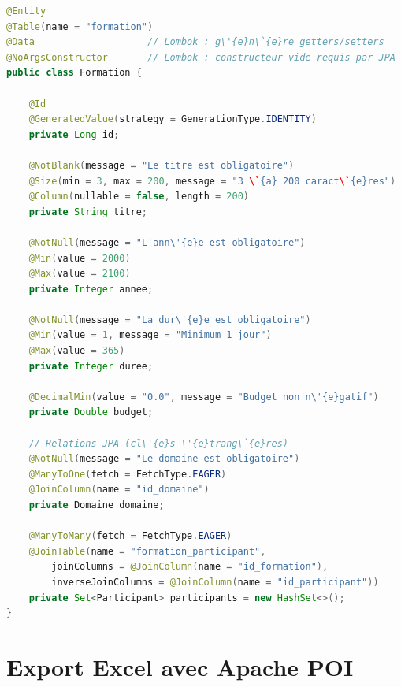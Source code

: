 \documentclass[12pt,a4paper]{report}
\begin{document}
\begin{lstlisting}[language=Java, caption={Formation.java --- Entit\'{e} principale avec validation}]
@Entity
@Table(name = "formation")
@Data                    // Lombok : g\'{e}n\`{e}re getters/setters
@NoArgsConstructor       // Lombok : constructeur vide requis par JPA
public class Formation {

    @Id
    @GeneratedValue(strategy = GenerationType.IDENTITY)
    private Long id;

    @NotBlank(message = "Le titre est obligatoire")
    @Size(min = 3, max = 200, message = "3 \`{a} 200 caract\`{e}res")
    @Column(nullable = false, length = 200)
    private String titre;

    @NotNull(message = "L'ann\'{e}e est obligatoire")
    @Min(value = 2000)
    @Max(value = 2100)
    private Integer annee;

    @NotNull(message = "La dur\'{e}e est obligatoire")
    @Min(value = 1, message = "Minimum 1 jour")
    @Max(value = 365)
    private Integer duree;

    @DecimalMin(value = "0.0", message = "Budget non n\'{e}gatif")
    private Double budget;

    // Relations JPA (cl\'{e}s \'{e}trang\`{e}res)
    @NotNull(message = "Le domaine est obligatoire")
    @ManyToOne(fetch = FetchType.EAGER)
    @JoinColumn(name = "id_domaine")
    private Domaine domaine;

    @ManyToMany(fetch = FetchType.EAGER)
    @JoinTable(name = "formation_participant",
        joinColumns = @JoinColumn(name = "id_formation"),
        inverseJoinColumns = @JoinColumn(name = "id_participant"))
    private Set<Participant> participants = new HashSet<>();
}
\end{lstlisting}

\section{Export Excel avec Apache POI}
\end{document}

